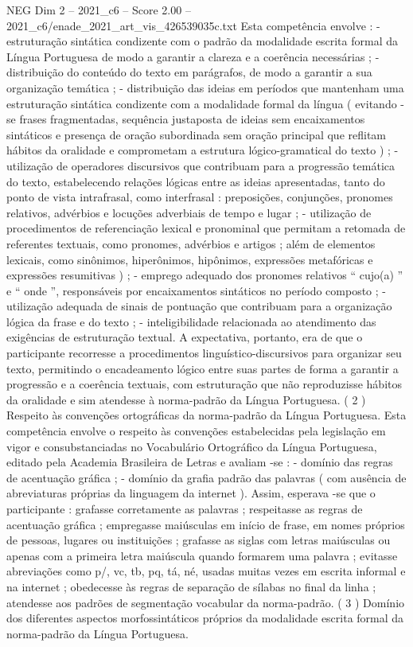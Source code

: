 \begin{textsample}{NEG Dim 2 – 2021\_c6 – Score 2.00 – 2021\_c6/enade\_2021\_art\_vis\_426539035c.txt}
Esta competência envolve : - estruturação sintática condizente com o padrão da modalidade escrita formal da Língua Portuguesa de modo a garantir a clareza e a coerência necessárias ; - distribuição do conteúdo do texto em parágrafos, de modo a garantir a sua organização temática ; - distribuição das ideias em períodos que mantenham uma estruturação sintática condizente com a modalidade formal da língua ( evitando -se frases fragmentadas, sequência justaposta de ideias sem encaixamentos sintáticos e presença de oração subordinada sem oração principal que reflitam hábitos da oralidade e comprometam a estrutura lógico-gramatical do texto ) ; - utilização de operadores discursivos que contribuam para a progressão temática do texto, estabelecendo relações lógicas entre as ideias apresentadas, tanto do ponto de vista intrafrasal, como interfrasal : preposições, conjunções, pronomes relativos, advérbios e locuções adverbiais de tempo e lugar ; - utilização de procedimentos de referenciação lexical e pronominal que permitam a retomada de referentes textuais, como pronomes, advérbios e artigos ; além de elementos lexicais, como sinônimos, hiperônimos, hipônimos, expressões metafóricas e expressões resumitivas ) ; - emprego adequado dos pronomes relativos “ cujo(a) ” e “ onde ”, responsáveis por encaixamentos sintáticos no período composto ; - utilização adequada de sinais de pontuação que contribuam para a organização lógica da frase e do texto ; - inteligibilidade relacionada ao atendimento das exigências de estruturação textual.
A expectativa, portanto, era de que o participante recorresse a procedimentos linguístico-discursivos para organizar seu texto, permitindo o encadeamento lógico entre suas partes de forma a garantir a progressão e a coerência textuais, com estruturação que não reproduzisse hábitos da oralidade e sim atendesse à norma-padrão da Língua Portuguesa. ( 2 ) Respeito às convenções ortográficas da norma-padrão da Língua Portuguesa.
Esta competência envolve o respeito às convenções estabelecidas pela legislação em vigor e consubstanciadas no Vocabulário Ortográfico da Língua Portuguesa, editado pela Academia Brasileira de Letras e avaliam -se : - domínio das regras de acentuação gráfica ; - domínio da grafia padrão das palavras ( com ausência de abreviaturas próprias da linguagem da internet ).
Assim, esperava -se que o participante : grafasse corretamente as palavras ; respeitasse as regras de acentuação gráfica ; empregasse maiúsculas em início de frase, em nomes próprios de pessoas, lugares ou instituições ; grafasse as siglas com letras maiúsculas ou apenas com a primeira letra maiúscula quando formarem uma palavra ; evitasse abreviações como p/, vc, tb, pq, tá, né, usadas muitas vezes em escrita informal e na internet ; obedecesse às regras de separação de sílabas no final da linha ; atendesse aos padrões de segmentação vocabular da norma-padrão. ( 3 ) Domínio dos diferentes aspectos morfossintáticos próprios da modalidade escrita formal da norma-padrão da Língua Portuguesa.

\end{textsample}
